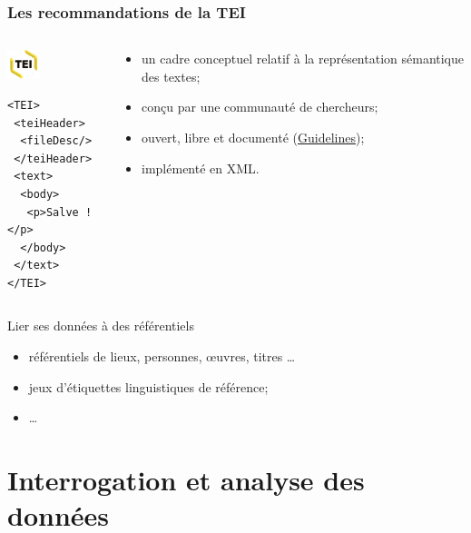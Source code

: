 \documentclass[ignorenonframetext]{beamer}
\begin{document}
\begin{frame}[fragile]
\frametitle{Les recommandations de la TEI}
	
	\begin{columns}
		\begin{column}{0.5\textwidth}
\includegraphics[width=0.35\textwidth]{img/TEI-glow.png}	
\begin{verbatim}
<TEI>
 <teiHeader>
  <fileDesc/>
 </teiHeader>
 <text>
  <body>
   <p>Salve !</p>
  </body>
 </text>
</TEI>
\end{verbatim}
\end{column}			
		\begin{column}{0.5\textwidth}
			\begin{itemize}
				\item un cadre conceptuel relatif à la représentation sémantique des textes;
				\item conçu par une communauté de chercheurs;
				\item ouvert, libre et documenté (\href{http://www.tei-c.org/release/doc/tei-p5-doc/en/html/}{Guidelines});
				\item implémenté en XML.
			\end{itemize}
		\end{column}
	\end{columns}
	
\end{frame}


\begin{frame}{Lier ses données à des référentiels}
	\begin{itemize}
		\item référentiels de lieux, personnes, œuvres, titres …
		\item jeux d'étiquettes linguistiques de référence;
		\item …
	\end{itemize}
\end{frame}


\section{Interrogation et analyse des données}
\end{document}

